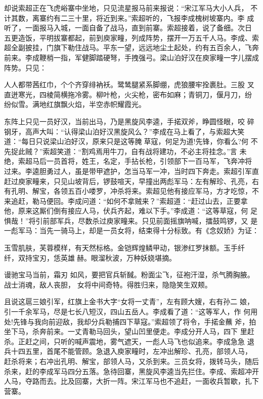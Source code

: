 却说索超正在飞虎峪寨中坐地，只见流星报马前来报说：“宋江军马大小人兵，
不计其数，离寨约有二三十里，将近到来。”索超听的，飞报李成槐树坡寨内。李
成听了，一面报马入城，一面自备了战马，直到前寨。索超接着，说了备细。次日
五更造饭，平明拔寨都起，前到庾家疃，列成阵势，摆开一万五千人马。李成、索
超全副披挂，门旗下勒住战马。平东一望，远远地尘土起处，约有五百余人，飞奔
前来。李成鞭梢一指，军健脚踏硬弩，手拽强弓。梁山泊好汉在庾家疃一字儿摆成
阵势。只见：

人人都带茜红巾，个个齐穿绯衲袄。鹭鸶腿紧系脚绷，虎狼腰牢拴裹肚。三股
叉直迸寒光，四棱简横拖冷雾。柳叶枪，火尖枪，密布如麻；青铜刀，偃月刀，纷
纷似雪。满地红旗飘火焰，半空赤帜耀霞光。

东阵上只见一员好汉，当前出马，乃是黑旋风李逵，手掿双斧，睁圆怪眼，咬
碎钢牙，高声大叫：“认得梁山泊好汉黑旋风么？”李成在马上看了，与索超大笑
道：“每日只说梁山泊好汉，原来只是这等腌草寇，何足为道!先锋，你看么?何
不先捉此贼？”索超笑道：“割鸡焉用牛刀，自有战将建功，不必主将挂念。”言
未绝，索超马后一员首将，姓王，名定，手拈长枪，引领部下一百马军，飞奔冲将
过来。李逵胆勇过人，虽是带甲遮护，怎当马军一冲，当时四下奔走。索超引军直
赶过庾家疃来，只见山坡背后，锣鼓喧天，早撞出两彪军马：左有解珍、孔亮，右
有孔明、解宝，各领五百小喽罗，冲杀将来。索超见他有接应军马，方才吃惊，不
来追赶，勒马便回。李成问道：“如何不拿贼来？”索超道：“赶过山去，正要拿
他，原来这厮们倒有接应人马，伏兵齐起，难以下手。”李成道：“这等草寇，何
足惧哉！”将引前部军兵，尽数杀过庾家疃来。只见前面摇旗呐喊，擂鼓鸣锣，又
是一彪军马：当先一骑马上，却是一员女将，结束得十分标致。有《念奴娇》为证：

玉雪肌肤，芙蓉模样，有天然标格。金铠辉煌鳞甲动，银渗红罗抹额。玉手纤
纤，双持宝刃，恁英雄赫。眼溜秋波，万种妖娆堪摘。

谩驰宝马当前，霜刃
如风，要把官兵斩馘。粉面尘飞，征袍汗湿，杀气腾胸腋。战士消魂，敌人丧胆，
女将中间奇特。得胜归来，隐隐笑生双颊。

且说这扈三娘引军，红旗上金书大字“女将一丈青”，左有顾大嫂，右有孙二
娘，引一千余军马，尽是七长八短汉，四山五岳人。李成看了道：“这等军人，作
何用处!先锋与我向前迎敌，我却分兵勒捕四下草寇。”索超领了将令，手掿金蘸
斧，拍坐下马，杀奔前来。一丈青勒马回头，望山凹里便走。李成分开人马，四下
里赶杀。正赶之间，只听的喊声震地，雾气遮天，一彪人马飞也似追来。李成急急
退兵十四五里，首尾不能管顾。急退入庾家疃时，左冲出解珍、孔亮，部领人马，
赶杀将来；右冲出孔明、解宝，部领人马，又杀到来。三员女将，拨转马头，随后
杀来，赶的李成军马四分五落。急待回寨，黑旋风李逵当先拦住。李成、索超冲开
人马，夺路而去。比及回寨，大折一阵。宋江军马也不追赶，一面收兵暂歇，扎下
营寨。

